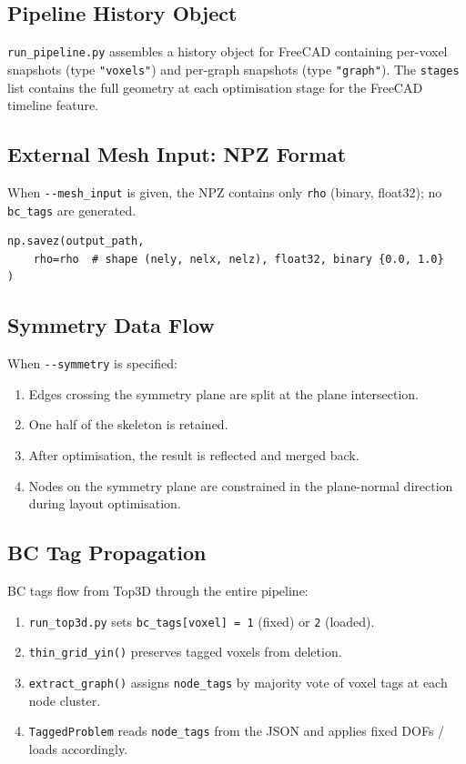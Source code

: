 \documentclass[a4paper, 11pt, openany]{report}
\begin{document}
\subsection{Pipeline History Object}

\texttt{run\_pipeline.py} assembles a history object for FreeCAD containing
per-voxel snapshots (type \texttt{"voxels"}) and per-graph snapshots (type
\texttt{"graph"}).  The \texttt{stages} list contains the full geometry at each
optimisation stage for the FreeCAD timeline feature.


\subsection{External Mesh Input: NPZ Format}

When \texttt{-{}-mesh\_input} is given, the NPZ contains only \texttt{rho}
(binary, float32); no \texttt{bc\_tags} are generated.

\begin{lstlisting}[style=pythonstyle]
np.savez(output_path,
    rho=rho  # shape (nely, nelx, nelz), float32, binary {0.0, 1.0}
)
\end{lstlisting}


\subsection{Symmetry Data Flow}

When \texttt{-{}-symmetry} is specified:
\begin{enumerate}[nosep]
    \item Edges crossing the symmetry plane are split at the plane intersection.
    \item One half of the skeleton is retained.
    \item After optimisation, the result is reflected and merged back.
    \item Nodes on the symmetry plane are constrained in the plane-normal
          direction during layout optimisation.
\end{enumerate}


\subsection{BC Tag Propagation}

BC tags flow from Top3D through the entire pipeline:
\begin{enumerate}[nosep]
    \item \texttt{run\_top3d.py} sets \texttt{bc\_tags[voxel] = 1} (fixed) or
          \texttt{2} (loaded).
    \item \texttt{thin\_grid\_yin()} preserves tagged voxels from deletion.
    \item \texttt{extract\_graph()} assigns \texttt{node\_tags} by majority vote
          of voxel tags at each node cluster.
    \item \texttt{TaggedProblem} reads \texttt{node\_tags} from the JSON and
          applies fixed DOFs / loads accordingly.
\end{enumerate}
\end{document}
